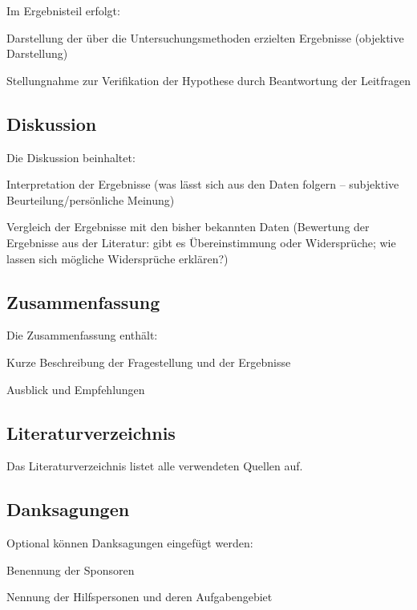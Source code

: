 Im Ergebnisteil erfolgt:
\begin{listenabsatz}
	\item Darstellung der über die Untersuchungsmethoden erzielten Ergebnisse (objektive Darstellung)
	\item Stellungnahme zur Verifikation der Hypothese durch Beantwortung der Leitfragen
\end{listenabsatz}

\subsection*{Diskussion}
\label{subsec:diskussion_struktur}

Die Diskussion beinhaltet:
\begin{listenabsatz}
	\item Interpretation der Ergebnisse (was lässt sich aus den Daten folgern -- subjektive Beurteilung/persönliche Meinung)
	\item Vergleich der Ergebnisse mit den bisher bekannten Daten (Bewertung der Ergebnisse aus der Literatur: gibt es Übereinstimmung oder Widersprüche; wie lassen sich mögliche Widersprüche erklären?)
\end{listenabsatz}

\subsection*{Zusammenfassung}
\label{subsec:zusammenfassung_struktur}

Die Zusammenfassung enthält:
\begin{listenabsatz}
	\item Kurze Beschreibung der Fragestellung und der Ergebnisse
	\item Ausblick und Empfehlungen
\end{listenabsatz}

\subsection*{Literaturverzeichnis}
\label{subsec:literatur_struktur}

Das Literaturverzeichnis listet alle verwendeten Quellen auf.

\subsection*{Danksagungen}
\label{subsec:danksagungen_struktur}

Optional können Danksagungen eingefügt werden:
\begin{listenabsatz}
	\item Benennung der Sponsoren
	\item Nennung der Hilfspersonen und deren Aufgabengebiet
\end{listenabsatz}

